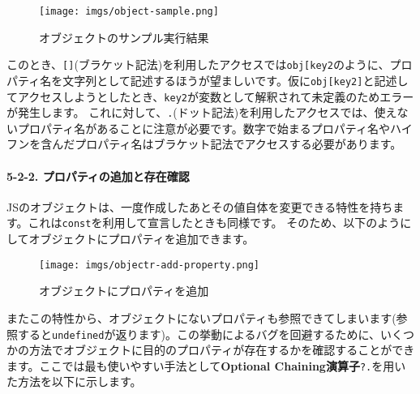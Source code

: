 \begin{figure}
\centering
\texttt{[image: imgs/object-sample.png]}
\caption{オブジェクトのサンプル実行結果}
\end{figure}

このとき、\texttt{{[}{]}}(ブラケット記法)を利用したアクセスでは\texttt{obj{[}\textquotesingle{}key2\textquotesingle{}{]}}のように、プロパティ名を文字列として記述するほうが望ましいです。仮に\texttt{obj{[}key2{]}}と記述してアクセスしようとしたとき、\texttt{key2}が変数として解釈されて未定義のためエラーが発生します。
これに対して、\texttt{.}(ドット記法)を利用したアクセスでは、使えないプロパティ名があることに注意が必要です。数字で始まるプロパティ名やハイフンを含んだプロパティ名はブラケット記法でアクセスする必要があります。

\paragraph{5-2-2.
プロパティの追加と存在確認}\label{ux30d7ux30edux30d1ux30c6ux30a3ux306eux8ffdux52a0ux3068ux5b58ux5728ux78baux8a8d}

JSのオブジェクトは、一度作成したあとその値自体を変更できる特性を持ちます。これは\texttt{const}を利用して宣言したときも同様です。
そのため、以下のようにしてオブジェクトにプロパティを追加できます。

\begin{Shaded}
\begin{Highlighting}[]
\OperatorTok{=}\NormalTok{ \{\}}\OperatorTok{;}

 \OperatorTok{=} \OperatorTok{;}
\NormalTok{obj[}\NormalTok{] }\OperatorTok{=} \OperatorTok{;}

\OperatorTok{,}\NormalTok{ obj[}\NormalTok{])}\OperatorTok{;}
\end{Highlighting}
\end{Shaded}

\begin{figure}
\centering
\texttt{[image: imgs/objectr-add-property.png]}
\caption{オブジェクトにプロパティを追加}
\end{figure}

またこの特性から、オブジェクトにないプロパティも参照できてしまいます(参照すると\texttt{undefined}が返ります)。この挙動によるバグを回避するために、いくつかの方法でオブジェクトに目的のプロパティが存在するかを確認することができます。ここでは最も使いやすい手法として\textbf{Optional
Chaining演算子}\texttt{?.}を用いた方法を以下に示します。

